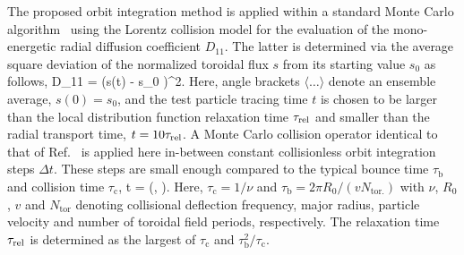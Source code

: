 \documentclass[./main.tex]{subfiles}
\begin{document}
The proposed orbit integration method is applied
within a standard Monte Carlo algorithm~\cite{boozer_monte_1981}
using the Lorentz collision model for the evaluation of the mono-energetic radial diffusion coefficient $D_{11}$.
The latter is determined via the average square deviation
of the normalized toroidal flux $s$ from its starting value $s_0$ as follows,
D_{11} =  \langle\left(s(t) - s_0 \right)^2\rangle.
\ee
Here, angle brackets $\langle\dots\rangle$ denote an ensemble average, $s(0)=s_0$, and the test particle tracing time $t$ is chosen to
be larger than the local distribution function relaxation time $\tau_{\rm rel}$
and smaller than the radial transport time, $t=10 \tau_{\rm rel}$.
A Monte Carlo collision operator identical to that of Ref.~\cite{boozer_monte_1981} is applied here in-between
constant collisionless orbit integration steps $\Delta t$. These steps are small enough compared to the typical bounce time
$\tau_\mathrm{b}$ and collision time $\tau_\mathrm{c}$,
\Delta t = \min \left(, \right).
\ee
Here, $\tau_{\mathrm{c}} = 1/\nu$ and $\tau_\mathrm{b} = 2 \pi R_0 / (v N_\mathrm{tor.})$ with $\nu$,  $R_0$, $v$ and $N_\mathrm{tor}$ denoting collisional deflection frequency, major radius, particle velocity and
number of toroidal field periods, respectively. The relaxation time $\tau_{\rm rel}$ is determined as the largest of
$\tau_{\mathrm{c}}$ and $\tau_\mathrm{b}^2/\tau_{\mathrm{c}}$.
\end{document}
